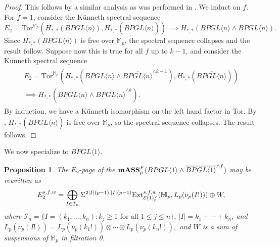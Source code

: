 \documentclass{amsart}
\newtheorem{proposition}[theorem]{Proposition}
\theoremstyle{plain}
\numberwithin{theorem}{section}
\numberwithin{equation}{section}
\numberwithin{figure}{section}
\newcommand{\0}{\langle 0 \rangle }
\begin{document}
\begin{proof}
    This follows by a similar analysis as was performed in . We induct on $f$. For $f=1$, consider the K\"unneth spectral sequence
    \[E_2 = \text{Tor}^{\mathbb{M}_p}(H_{*,*}(BPGL \langle n \rangle), H_{*,*}(\overline{BPGL \langle n \rangle})) \implies H_{*,*}(BPGL \langle n \rangle \wedge BPGL \langle n \rangle).\]
    Since $H_{*,*}(BPGL \langle n \rangle)$ is free over $\mathbb{M}_p$, the spectral sequence collapses and the result follow. Suppose now this is true for all $f$ up to $k-1$, and consider the K\"unneth spectral sequence
    \begin{align*}
    \begin{split}
    E_2 = \text{Tor}^{\mathbb{M}_p}(H_{*,*}(BPGL \langle n \rangle \wedge \overline{BPGL \langle n \rangle}^{\wedge {k-1}}), H_{*,*}(\overline{BPGL \langle n \rangle})) \\
    \implies H_{*,*}(BPGL \langle n \rangle \wedge \overline{BPGL \langle n \rangle}^{\wedge k}).
    \end{split}
    \end{align*}
    By induction, we have a K\"unneth isomorphism on the left hand factor in Tor. By , $H_{*,*}(\overline{BPGL\langle n \rangle})$ is free over $\mathbb{M}_p$, so the spectral sequence collapses. The result follows.
\end{proof}

We now specialize to $BPGL\langle 1 \rangle$.
\begin{proposition}
\label{prop:E2BPGL1Resn-line}
    The $E_2$-page of the $\textup{\textbf{mASS}}_p^F(BPGL \langle 1 \rangle \wedge \overline{BPGL \langle 1 \rangle}^{\wedge f})$ may be rewritten as
    \[E_2^{s,f,w} = \bigoplus_{I \in \mathcal{I}_n}\Sigma^{2|I|(p-1), |I|(p-1)}\textup{Ext}^{s,f,w}_{\mathcal{E}(1)^\vee_p}(\mathbb{M}_p, L_p(\nu_p(I!))) \oplus W,\]
    where $\mathcal{I}_n = \{I=(k_1, \dots, k_n): k_j \geq 1 \text{ for all } 1 \leq j \leq n\}$, $|I| = k_1 + \cdots+ k_n$, and $L_p(\nu_p(I!)) = L_p(\nu_p(k_1!)) \otimes \cdots \otimes L_p(\nu_p(k_n!)),$ and $W$ is a sum of suspensions of $\mathbb{M}_p$ in filtration 0.    
\end{proposition}
\end{document}
